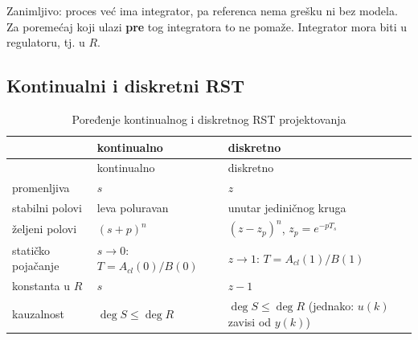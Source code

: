 \documentclass[11pt,a4paper,parskip=half,headsepline,numbers=noenddot]{scrartcl}
\begin{document}
Zanimljivo: proces već ima integrator, pa referenca nema grešku ni bez modela. Za poremećaj koji ulazi \textbf{pre} tog integratora to ne pomaže. Integrator mora biti u regulatoru, tj. u \(R\).

\subsection{Kontinualni i diskretni RST}

\begin{longtable}[]{@{}
  >{\raggedright\arraybackslash}p{}
  >{\raggedright\arraybackslash}p{}
  >{\raggedright\arraybackslash}p{}@{}}
\caption{Poređenje kontinualnog i diskretnog RST projektovanja}\tabularnewline
\toprule\noalign{}
\begin{minipage}[b]{\linewidth}\raggedright
\end{minipage} & \begin{minipage}[b]{\linewidth}\raggedright
kontinualno
\end{minipage} & \begin{minipage}[b]{\linewidth}\raggedright
diskretno
\end{minipage} \\
\midrule\noalign{}
\endfirsthead
\toprule\noalign{}
\begin{minipage}[b]{\linewidth}\raggedright
\end{minipage} & \begin{minipage}[b]{\linewidth}\raggedright
kontinualno
\end{minipage} & \begin{minipage}[b]{\linewidth}\raggedright
diskretno
\end{minipage} \\
\midrule\noalign{}
\endhead
\bottomrule\noalign{}
\endlastfoot
promenljiva & \(s\) & \(z\) \\
stabilni polovi & leva poluravan & unutar jediničnog kruga \\
željeni polovi & \((s + p)^n\) & \((z - z_p)^n\), \(z_p = e^{-pT_s}\) \\
statičko pojačanje & \(s \to 0\): \(T = A_{cl}(0)/B(0)\) & \(z \to 1\): \(T = A_{cl}(1)/B(1)\) \\
konstanta u \(R\) & \(s\) & \(z - 1\) \\
kauzalnost & \(\deg S \le \deg R\) & \(\deg S \le \deg R\) (jednako: \(u(k)\) zavisi od \(y(k)\)) \\
\end{longtable}
\end{document}
